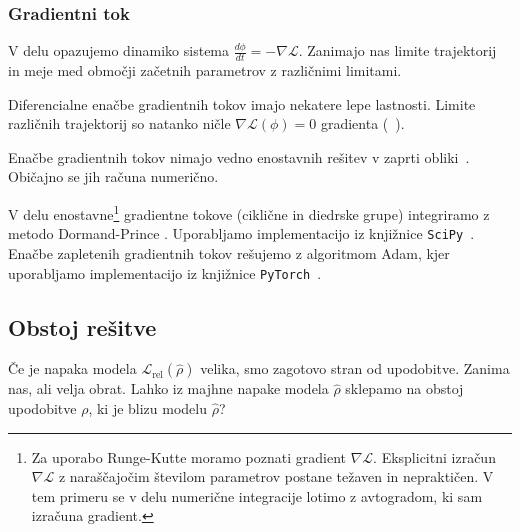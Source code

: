 \documentclass[mat2, tisk]{fmfdelo}
\newcommand{\loss}{\mathcal L}
\newcommand{\Loss}[1]{\mathcal L _\text{#1}}
\begin{document}
\subsubsection{Gradientni tok}
V delu opazujemo dinamiko sistema $\frac{d\phi}{dt} = - \nabla
\loss $. Zanimajo nas limite trajektorij in meje med območji
začetnih parametrov z različnimi limitami.

Diferencialne enačbe gradientnih tokov imajo nekatere lepe
lastnosti. Limite različnih trajektorij
so natanko ničle $\nabla\loss(\phi) = 0$ gradienta
(~\cite[poglavje 9.3]{Hirsch2012dynamical-systems}).
\begin{opomba}
  Enačbe gradientnih tokov nimajo vedno enostavnih  rešitev v
  zaprti obliki~\cite{park2024absenceclosedformdescriptionsgradient}.
  Običajno se jih
  računa numerično.

  V delu enostavne\footnote{Za uporabo Runge-Kutte moramo
    poznati gradient $\nabla \loss$. Eksplicitni izračun $\nabla
    \loss $ z naraščajočim številom parametrov postane težaven in
    nepraktičen. V tem primeru se v delu numerične integracije
  lotimo z avtogradom, ki sam izračuna gradient.}  gradientne
  tokove (ciklične in diedrske grupe)
  integriramo
  z metodo Dormand-Prince
  \cite{solvingordinarydifferentialequations1993nonstiff}. Uporabljamo
  implementacijo iz knjižnice \texttt{SciPy}~\cite{2020SciPy-NMeth}.
  Enačbe zapletenih
  gradientnih tokov rešujemo z algoritmom Adam, kjer uporabljamo
  implementacijo iz knjižnice \texttt{PyTorch}~\cite{paszke2019pytorch}.
\end{opomba}
\subsection{Obstoj rešitve}
\label{subsection : obstoj resitve}

Če je napaka modela $\Loss{rel}(\hat \rho)$ velika,
smo zagotovo stran od upodobitve.
Zanima nas, ali velja obrat. Lahko iz majhne napake modela
$\hat \rho$ sklepamo na obstoj
upodobitve $\rho$, ki je blizu modelu $\hat \rho$?
\end{document}
